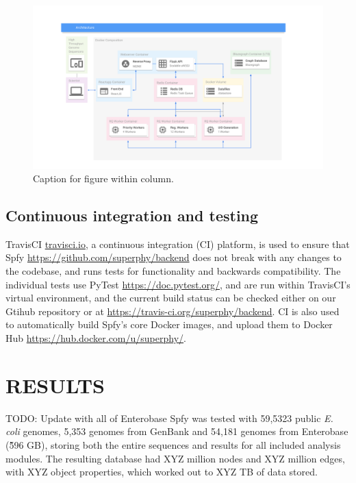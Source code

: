 \documentclass[a4,center,fleqn]{NAR}
\begin{document}
\begin{figure}[t]
\begin{center}
\includegraphics{images/docker.svg}
\end{center}
\caption{Caption for figure within column.}
\label{fig-docker}
\end{figure}

\subsection{Continuous integration and testing}

TravisCI \url{travisci.io}, a continuous integration (CI) platform, is used to ensure that Spfy \url{https://github.com/superphy/backend} does not break with any changes to the codebase, and runs tests for functionality and backwards compatibility.
The individual tests use PyTest \url{https://doc.pytest.org/}, and are run within TravisCI's virtual environment, and the current build status can be checked either on our Gtihub repository or at \url{https://travis-ci.org/superphy/backend}.
CI is also used to automatically build Spfy's core Docker images, and upload them to Docker Hub \url{https://hub.docker.com/u/superphy/}.

\section{RESULTS}
TODO: Update with all of Enterobase
Spfy was tested with 59,5323 public \textit{E. coli} genomes, 5,353 genomes from GenBank and 54,181 genomes from Enterobase (\~596 GB), storing both the entire sequences and results for all included analysis modules.
The resulting database had XYZ million nodes and XYZ million edges, with XYZ object properties, which worked out to XYZ TB of data stored.
\end{document}

